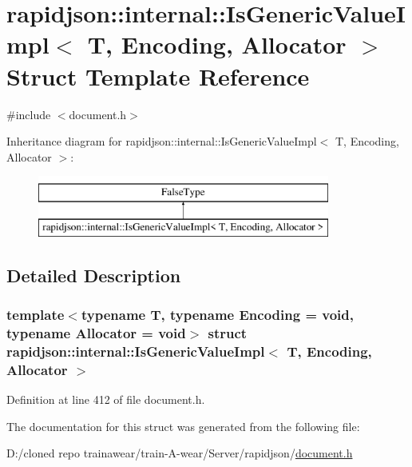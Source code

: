 \hypertarget{structrapidjson_1_1internal_1_1_is_generic_value_impl}{}\section{rapidjson\+::internal\+::Is\+Generic\+Value\+Impl$<$ T, Encoding, Allocator $>$ Struct Template Reference}
\label{structrapidjson_1_1internal_1_1_is_generic_value_impl}


{\ttfamily \#include $<$document.\+h$>$}

Inheritance diagram for rapidjson\+::internal\+::Is\+Generic\+Value\+Impl$<$ T, Encoding, Allocator $>$\+:\begin{figure}[H]
\begin{center}
\leavevmode
\includegraphics[height=2.000000cm]{structrapidjson_1_1internal_1_1_is_generic_value_impl}
\end{center}
\end{figure}


\subsection{Detailed Description}
\subsubsection*{template$<$typename T, typename Encoding = void, typename Allocator = void$>$\newline
struct rapidjson\+::internal\+::\+Is\+Generic\+Value\+Impl$<$ T, Encoding, Allocator $>$}



Definition at line 412 of file document.\+h.



The documentation for this struct was generated from the following file\+:\begin{DoxyCompactItemize}
\item 
D\+:/cloned repo trainawear/train-\/\+A-\/wear/\+Server/rapidjson/\mbox{\hyperlink{document_8h}{document.\+h}}\end{DoxyCompactItemize}
